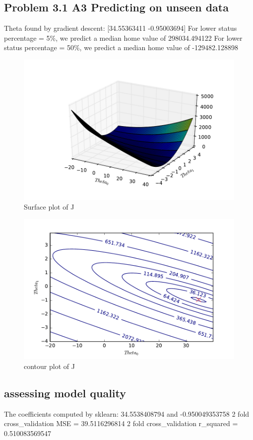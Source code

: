 \documentclass[pdftex,11pt]{article}
\begin{document}
\subsection{Problem 3.1 A3 Predicting on unseen data}
Theta found by gradient descent: [34.55363411  -0.95003694]
For lower status percentage = 5\%, we predict a median home value of 298034.494122
For lower status percentage = 50\%, we predict a median home value of -129482.128898
\begin{figure}[H]
  \caption{Surface plot of J}
  \centering
    \includegraphics[scale=1]{fig3a.pdf}
\end{figure}
\begin{figure}[H]
  \caption{contour plot of J}
  \centering
    \includegraphics[scale=1]{fig3b.pdf}
\end{figure}
\subsection{assessing model quality}
The coefficients computed by sklearn:  34.5538408794  and  -0.950049353758
2  fold cross\_validation MSE =  39.5116296814
2  fold cross\_validation r\_squared =  0.510083569547
\end{document}
